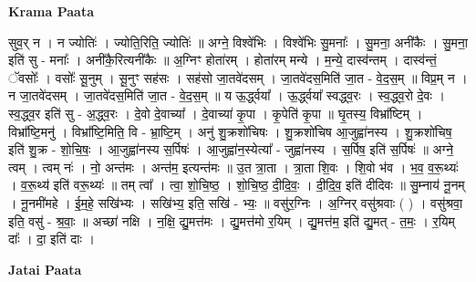 \documentclass[17pt]{extarticle}
\begin{document}
\textbf{Krama Paata} \newline

सुव॒र् न । न ज्योतिः॑ । ज्योति॒रिति॒ ज्योतिः॑ ॥ अग्ने॒ विश्वे॑भिः । विश्वे॑भिः सु॒मनाः᳚ । सु॒मना॒ अनी॑कैः । सु॒मना॒ इति॑ सु - मनाः᳚ । अनी॑कै॒रित्यनी॑कैः ॥ अ॒ग्निꣳ होता॑रम् । होता॑रम् मन्ये । म॒न्ये॒ दास्व॑न्तम् । दास्व॑न्तं॒ ॅवसोः᳚ । वसोः᳚ सू॒नुम् । सू॒नुꣳ सह॑सः । सह॑सो जा॒तवे॑दसम् । जा॒तवे॑दस॒मिति॑ जा॒त - वे॒द॒स॒म् ॥ विप्र॒म् न । न जा॒तवे॑दसम् । जा॒तवे॑दस॒मिति॑ जा॒त - वे॒द॒स॒म् ॥ य ऊ॒र्द्ध्वया᳚ । ऊ॒र्द्ध्वया᳚ स्वद्ध्व॒रः । स्व॒द्ध्व॒रो दे॒वः । स्व॒द्ध्व॒र इति॑ सु - अ॒द्ध्व॒रः । दे॒वो दे॒वाच्या᳚ । दे॒वाच्या॑ कृ॒पा । कृ॒पेति॑ कृ॒पा ॥ घृ॒तस्य॒ विभ्रा᳚ष्टिम् । विभ्रा᳚ष्टि॒मनु॑ । विभ्रा᳚ष्टि॒मिति॒ वि - भ्रा॒ष्टि॒म् । अनु॑ शु॒क्रशो॑चिषः । शु॒क्रशो॑चिष आ॒जुह्वा॑नस्य । शु॒क्रशो॑चिष॒ इति॑ शु॒क्र - शो॒चि॒षः॒ । आ॒जुह्वा॑नस्य स॒र्पिषः॑ । आ॒जुह्वा॑न॒स्येत्या᳚ - जुह्वा॑नस्य । स॒र्पिष॒ इति॑ स॒र्पिषः॑ ॥ अग्ने॒ त्वम् । त्वम् नः॑ । नो॒ अन्त॑मः । अन्त॑म॒ इत्यन्त॑मः ॥ उ॒त त्रा॒ता । त्रा॒ता शि॒वः । शि॒वो भ॑व । भ॒व॒ व॒रू॒थ्यः॑ । व॒रू॒थ्य॑ इति॑ वरू॒थ्यः॑ ॥ तम् त्वा᳚ । त्वा॒ शो॒चि॒ष्ठ॒ । शो॒चि॒ष्ठ॒ दी॒दि॒वः॒ । दी॒दि॒व॒ इति॑ दीदिवः ॥ सु॒म्नाय॑ नू॒नम् । नू॒नमी॑महे । ई॒म॒हे॒ सखि॑भ्यः । सखि॑भ्य॒ इति॒ सखि॑ - भ्यः॒ ॥ वसु॑र॒ग्निः । अ॒ग्निर् वसु॑श्रवाः ( ) । वसु॑श्रवा॒ इति॒ वसु॑ - श्र॒वाः॒ ॥ अच्छा॑ नक्षि । न॒क्षि॒ द्यु॒मत्त॑मः । द्यु॒मत्त॑मो र॒यिम् । द्यु॒मत्त॑म॒ इति॑ द्यु॒मत् - त॒मः॒ । र॒यिम् दाः᳚ । दा॒ इति॑ दाः । \newline

\textbf{Jatai Paata} \newline
\end{document}
